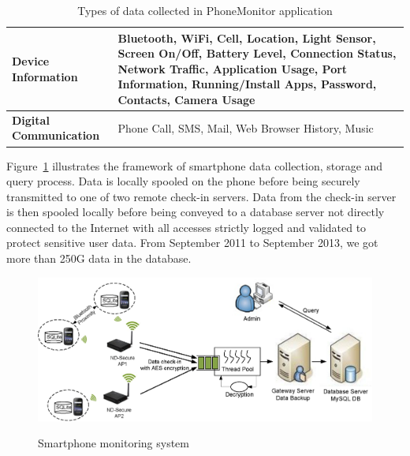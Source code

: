 \begin{table}[ht] 
\caption{Types of data collected in PhoneMonitor application} 
\centering  
\begin{tabular}{|l|m{10cm}|}
\hline
{\bf Device Information} & Bluetooth, WiFi, Cell, Location, Light Sensor, Screen On/Off, Battery Level, Connection Status, Network Traffic, Application Usage, Port Information, Running/Install Apps, Password, Contacts, Camera Usage\\
\hline
{\bf Digital Communication} & Phone Call, SMS, Mail, Web Browser History, Music\\
\hline
\end{tabular}
\label{table:data} 
\end{table}

Figure~\ref{fig:system} illustrates the framework of smartphone data collection, storage and query process. Data is locally spooled on the phone before being securely transmitted to one of two remote check-in servers.  Data from the check-in server is then spooled locally before being conveyed to a database server not directly connected to the Internet with all accesses strictly logged and validated to protect sensitive user data. From September 2011 to September 2013, we got more than 250G data in the database. 

\begin{figure}[h!tbp]
\centering 
{\includegraphics[width=6in]{graphs/system.eps}}
\caption{Smartphone monitoring system} 
\label{fig:system}
\end{figure} 

